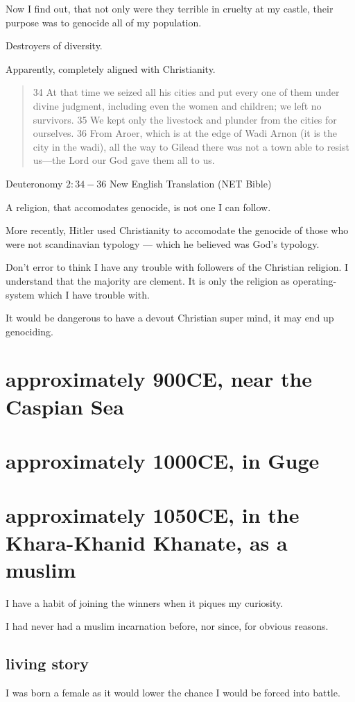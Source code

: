 Now I find out, that not only were they terrible in cruelty at my castle,
their purpose was to genocide all of my population.

Destroyers of diversity. 

Apparently, completely aligned with Christianity. 

\blockquote{34 At that time we seized all his cities and put every one of them 
under divine judgment, including even the women and children; we left no 
survivors. 35 We kept only the livestock and plunder from the cities for 
ourselves. 36 From Aroer, which is at the edge of Wadi Arnon (it is the city in
 the wadi), all the way to Gilead there was not a town able to resist us—the 
Lord our God gave them all to us.}{Deuteronomy $2:34-36$ New English Translation
(NET Bible)}
 
A religion, that accomodates genocide, is not one I can follow.

More recently, Hitler used Christianity\cite{christianhitler} to accomodate 
the genocide of those who were not scandinavian typology --- which he believed
was God's typology.

Don't error to think I have any trouble with followers of the Christian
religion. I understand that the majority are clement. It is only the religion as
operating-system which I have trouble with.

It would be dangerous to have a devout Christian super mind,
it may end up genociding.
\chapter{approximately 900CE, near the Caspian Sea}
\chapter{approximately 1000CE, in Guge}
\chapter{approximately 1050CE, in the Khara-Khanid Khanate, as a muslim}
\label{reincarnation:muslim}
I have a habit of joining the winners when it piques my curiosity. 

I had never had a muslim incarnation before, nor since, for obvious reasons.

\section{living story}
I was born a female as it would lower the chance I would be forced into battle. 

